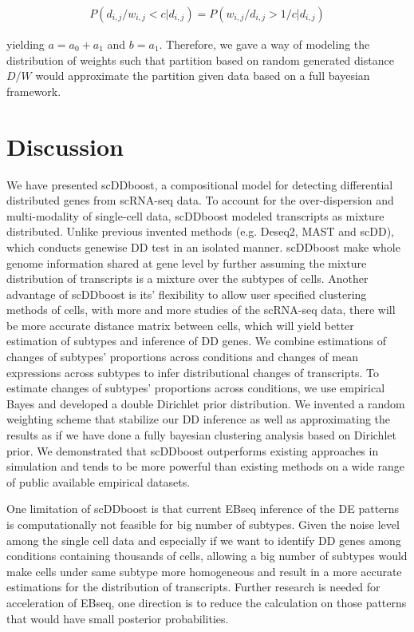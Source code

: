 \documentclass[aoas,preprint]{imsart}
\begin{document}
\begin{eqnarray*}
P(d_{i,j} / w_{i,j} < c | d_{i,j}) = P(w_{i,j} / d_{i,j} > 1 / c | d_{i,j})
\end{eqnarray*}

yielding $a = a_0 + a_1$ and $b = a_1$.  Therefore, we gave a way of modeling the distribution of weights such that partition based on random generated distance $D / W$ would approximate the partition given data based on a full bayesian framework.



\section{Discussion}
We have presented scDDboost, a compositional model for detecting differential distributed genes from scRNA-seq data. To account for the over-dispersion and multi-modality of single-cell data, scDDboost modeled transcripts as mixture distributed. Unlike previous invented methods (e.g. Deseq2, MAST and scDD), which conducts genewise DD test in an isolated manner. scDDboost make whole genome information shared at gene level by further assuming the mixture distribution of transcripts is a mixture over the subtypes of cells. Another advantage of scDDboost is its' flexibility to allow user specified clustering methods of cells, with more and more studies of the scRNA-seq data, there will be more accurate distance matrix between cells, which will yield better estimation of subtypes and inference of DD genes. We combine estimations of changes of subtypes' proportions across conditions and changes of mean expressions across subtypes to infer distributional changes of transcripts. To estimate changes of subtypes' proportions across conditions, we use empirical Bayes and developed a double Dirichlet prior distribution.  We invented a random weighting scheme that stabilize our DD inference as well as approximating the results as if we have done a fully bayesian clustering analysis based on Dirichlet prior.  We demonstrated that scDDboost outperforms existing approaches in simulation and tends to be more powerful than existing methods on a wide range of public available empirical datasets. 

One limitation of scDDboost is that current EBseq inference of the DE patterns is computationally not feasible for big number of subtypes. Given the noise level among the single cell data and especially if we want to identify DD genes among conditions containing thousands of cells, allowing a big number of subtypes would make cells under same subtype more homogeneous and result in a more accurate estimations for the distribution of transcripts. Further research is needed for acceleration of EBseq, one direction is to reduce the calculation on those patterns that would have small posterior probabilities. 
\end{document}
